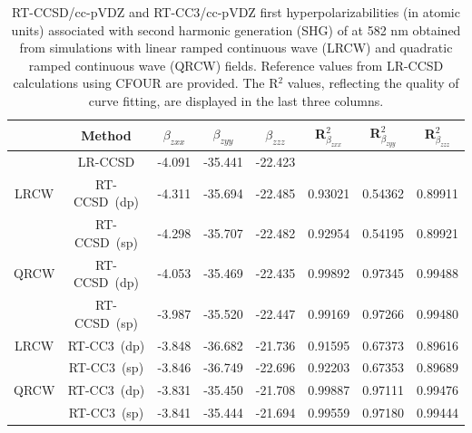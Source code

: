 \begin{table}
  \centering
  \caption{RT-CCSD/cc-pVDZ and RT-CC3/cc-pVDZ first hyperpolarizabilities (in atomic units) associated with second harmonic generation (SHG) of  at 582 nm obtained from simulations with linear ramped continuous wave (LRCW) and quadratic ramped continuous wave (QRCW) fields. Reference values from LR-CCSD calculations using CFOUR are provided. The R$^{2}$ values, reflecting the quality of curve fitting, are displayed in the last three columns.}
  \begin{tabular}{c|c|ccc|ccc}
                                        &  \textrm{Method}  & $\beta_{zxx}$ & $\beta_{zyy}$ & $\beta_{zzz}$ 
                                          & R$^{2}_{\beta_{zxx}}$ & R$^{2}_{\beta_{zyy}}$ & R$^{2}_{\beta_{zzz}}$\\
                                          \hline
    & \textrm{LR-CCSD} & -4.091 & -35.441 & -22.423 & & &\\                 
    \hline                      
     \textrm{LRCW} & \textrm{RT-CCSD\ (dp)} & -4.311 & -35.694 &  -22.485 & 0.93021 & 0.54362 & 0.89911 \\
                              & \textrm{RT-CCSD\ (sp)} & -4.298 & -35.707 & -22.482 & 0.92954 & 0.54195 & 0.89921 \\
    \hline
     \textrm{QRCW} & \textrm{RT-CCSD\ (dp)} & -4.053 & -35.469 &  -22.435 & 0.99892 & 0.97345 & 0.99488 \\
                              & \textrm{RT-CCSD\ (sp)} & -3.987 & -35.520 & -22.447 & 0.99169 & 0.97266 & 0.99480 \\
    \hline\hline
    \textrm{LRCW} & \textrm{RT-CC3\ (dp)} & -3.848 & -36.682 & -21.736 & 0.91595 & 0.67373 & 0.89616 \\
                             & \textrm{RT-CC3\ (sp)} & -3.846 & -36.749 & -22.696 & 0.92203 & 0.67353 & 0.89689 \\
      \hline
     \textrm{QRCW} & \textrm{RT-CC3\ (dp)} & -3.831 & -35.450 & -21.708 & 0.99887 & 0.97111 & 0.99476 \\
                             & \textrm{RT-CC3\ (sp)} & -3.841 & -35.444 & -21.694 & 0.99559 & 0.97180 & 0.99444 \\
  \end{tabular}
  \label{tab:hyp-shg}
\end{table}
